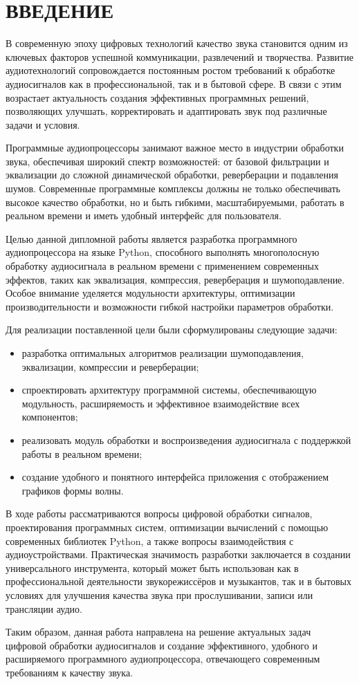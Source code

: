 \section*{ВВЕДЕНИЕ}

В современную эпоху цифровых технологий качество звука становится одним из ключевых факторов успешной коммуникации, развлечений и творчества. Развитие аудиотехнологий сопровождается постоянным ростом требований к обработке аудиосигналов как в профессиональной, так и в бытовой сфере. В связи с этим возрастает актуальность создания эффективных программных решений, позволяющих улучшать, корректировать и адаптировать звук под различные задачи и условия.

Программные аудиопроцессоры занимают важное место в индустрии обработки звука, обеспечивая широкий спектр возможностей: от базовой фильтрации и эквализации до сложной динамической обработки, реверберации и подавления шумов. Современные программные комплексы должны не только обеспечивать высокое качество обработки, но и быть гибкими, масштабируемыми, работать в реальном времени и иметь удобный интерфейс для пользователя.

Целью данной дипломной работы является разработка программного аудиопроцессора на языке Python, способного выполнять многополосную обработку аудиосигнала в реальном времени с применением современных эффектов, таких как эквализация, компрессия, реверберация и шумоподавление. Особое внимание уделяется модульности архитектуры, оптимизации производительности и возможности гибкой настройки параметров обработки.

Для реализации поставленной цели были сформулированы следующие задачи:
\begin{itemize}
	\item разработка оптимальных алгоритмов реализации шумоподавления, эквализации, компрессии и реверберации;
	\item спроектировать архитектуру программной системы, обеспечивающую модульность, расширяемость и эффективное взаимодействие всех компонентов;
	\item реализовать модуль обработки и воспроизведения аудиосигнала с поддержкой работы в реальном времени;
	\item создание удобного и понятного интерфейса приложения с отображением графиков формы волны.
\end{itemize}	

В ходе работы рассматриваются вопросы цифровой обработки сигналов, проектирования программных систем, оптимизации вычислений с помощью современных библиотек Python, а также вопросы взаимодействия с аудиоустройствами. Практическая значимость разработки заключается в создании универсального инструмента, который может быть использован как в профессиональной деятельности звукорежиссёров и музыкантов, так и в бытовых условиях для улучшения качества звука при прослушивании, записи или трансляции аудио.

Таким образом, данная работа направлена на решение актуальных задач цифровой обработки аудиосигналов и создание эффективного, удобного и расширяемого программного аудиопроцессора, отвечающего современным требованиям к качеству звука.